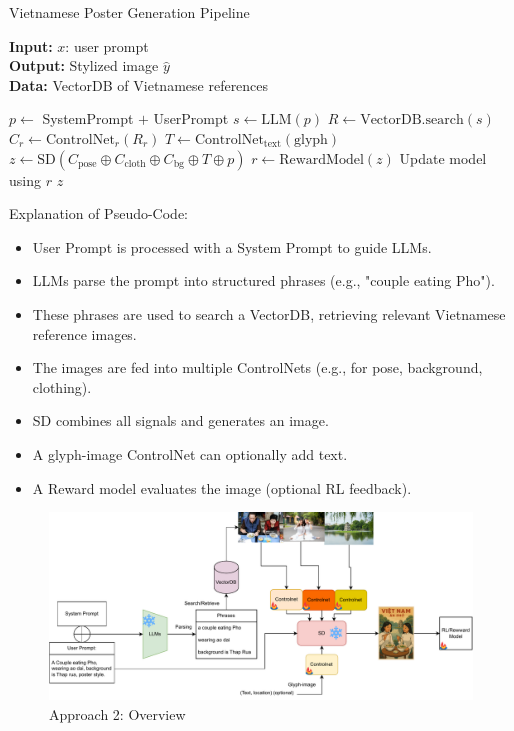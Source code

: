\documentclass[conference]{IEEEtran}
\begin{document}
	\begin{algorithm}
		\caption{Vietnamese Poster Generation Pipeline}
		\label{alg:1}
		\textbf{Input:} $x$: user prompt \\
		\textbf{Output:} Stylized image $\hat{y}$ \\
		\textbf{Data:} VectorDB of Vietnamese references
		
		\begin{algorithmic}[1]
			\State $p \gets$ SystemPrompt $+$ UserPrompt
			\State $s \gets \text{LLM}(p)$ 
			\State $R \gets \text{VectorDB.search}(s)$ 
			\State $C_r \gets \text{ControlNet}_r(R_r)$
			\EndFor
			\State $T \gets \text{ControlNet}_{\text{text}}(\text{glyph})$
			\EndIf
			\State $z \gets \text{SD}(C_{\text{pose}} \oplus C_{\text{cloth}} \oplus C_{\text{bg}} \oplus T \oplus p)$
			\State $r \gets \text{RewardModel}(z)$
			\State Update model using $r$
			\EndIf
			\State \Return $z$
		\end{algorithmic}
	\end{algorithm}
	
Explanation of Pseudo-Code:
\begin{itemize}
	\item User Prompt is processed with a System Prompt to guide LLMs.
	\item LLMs parse the prompt into structured phrases (e.g., "couple eating Pho").
	\item These phrases are used to search a VectorDB, retrieving relevant Vietnamese reference images.
	\item The images are fed into multiple ControlNets (e.g., for pose, background, clothing).
	\item SD combines all signals and generates an image.
	\item A glyph-image ControlNet can optionally add text.
	\item A Reward model evaluates the image (optional RL feedback).
\end{itemize}

\begin{figure}[h!]
	\centering
	\includegraphics[width=1\textwidth]{diffusionproposal2.pdf} %
	\caption{Approach 2: Overview}
	\label{fig:approach2}
\end{figure}
\end{document}
